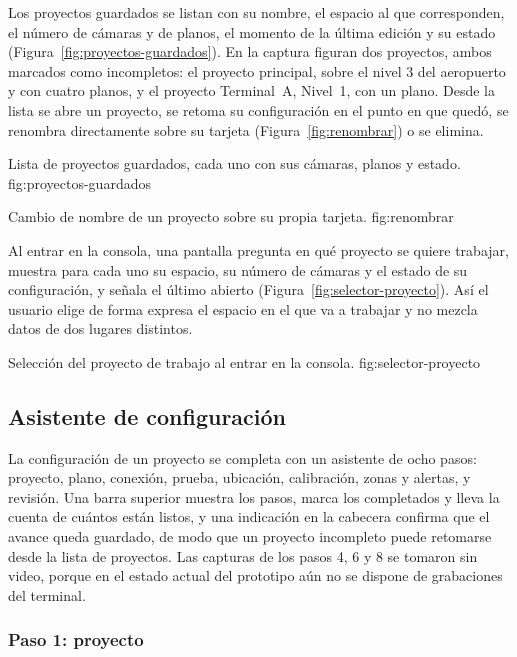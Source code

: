 Los proyectos guardados se listan con su nombre, el espacio al que
corresponden, el número de cámaras y de planos, el momento de la última
edición y su estado (Figura~\ref{fig:proyectos-guardados}). En la captura
figuran dos proyectos, ambos marcados como incompletos: el proyecto
principal, sobre el nivel 3 del aeropuerto y con cuatro planos, y el
proyecto Terminal~A, Nivel~1, con un plano. Desde la lista se abre un
proyecto, se retoma su configuración en el punto en que quedó, se
renombra directamente sobre su tarjeta (Figura~\ref{fig:renombrar}) o se
elimina.

  {Lista de proyectos guardados, cada uno con sus cámaras, planos y estado.}
  {fig:proyectos-guardados}

  {Cambio de nombre de un proyecto sobre su propia tarjeta.}
  {fig:renombrar}

Al entrar en la consola, una pantalla pregunta en qué proyecto se quiere
trabajar, muestra para cada uno su espacio, su número de cámaras y el
estado de su configuración, y señala el último abierto
(Figura~\ref{fig:selector-proyecto}). Así el usuario elige de forma
expresa el espacio en el que va a trabajar y no mezcla datos de dos
lugares distintos.

  {Selección del proyecto de trabajo al entrar en la consola.}
  {fig:selector-proyecto}

\subsection{Asistente de configuración}
\label{sec:diseno-asistente}

La configuración de un proyecto se completa con un asistente de ocho
pasos: proyecto, plano, conexión, prueba, ubicación, calibración, zonas y
alertas, y revisión. Una barra superior muestra los pasos, marca los
completados y lleva la cuenta de cuántos están listos, y una indicación
en la cabecera confirma que el avance queda guardado, de modo que un
proyecto incompleto puede retomarse desde la lista de proyectos. Las
capturas de los pasos 4, 6 y 8 se tomaron sin video, porque en el estado
actual del prototipo aún no se dispone de grabaciones del terminal.

\subsubsection*{Paso 1: proyecto}

